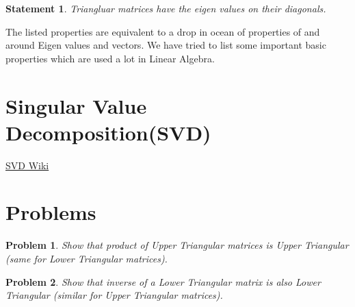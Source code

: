 \documentclass[a4paper]{article}
\newtheorem{problem}{Problem}
\newtheorem{statement}{Statement}
\begin{document}
    \begin{statement}
        Triangluar matrices have the eigen values on their diagonals.
    \end{statement}
    
      The listed properties are equivalent to a drop in ocean of properties of and around Eigen values and vectors. We have tried to list some important basic properties which are used a lot in Linear Algebra.
    
\section{Singular Value Decomposition(SVD)}
\href{https://brilliant.org/wiki/singular-value-decomposition/}{SVD Wiki}

\section{Problems}

\begin{problem}
    Show that product of Upper Triangular matrices is Upper Triangular (same for Lower Triangular matrices).
\end{problem}

\begin{problem}
    Show that inverse of a Lower Triangular matrix is also Lower Triangular (similar for Upper Triangular matrices).
\end{problem}
\end{document}

